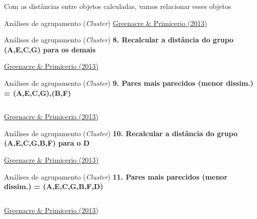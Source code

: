 \documentclass[
  ignorenonframetext,
]{beamer}
\begin{document}
\begin{frame}{Com as distâncias entre objetos calculadas, vamos
relacionar esses objetos}
\begin{block}{Análises de agrupamento (\emph{Cluster})}
\href{https://www.fbbva.es/microsite/multivariate-statistics/}{Greenacre
\& Primicerio (2013)}
\end{block}

\begin{block}{Análises de agrupamento (\emph{Cluster})}
\protect\hypertarget{anuxe1lises-de-agrupamento-cluster-7}{}
\textbf{8. Recalcular a distância do grupo (A,E,C,G) para os demais}

\href{https://www.fbbva.es/microsite/multivariate-statistics/}{Greenacre
\& Primicerio (2013)}
\end{block}

\begin{block}{Análises de agrupamento (\emph{Cluster})}
\protect\hypertarget{anuxe1lises-de-agrupamento-cluster-8}{}
\textbf{9. Pares mais parecidos (menor dissim.) = (A,E,C,G),(B,F)}

\begin{columns}[T]
\begin{column}{0.65\textwidth}
\end{column}

\begin{column}{0.35\textwidth}
\end{column}
\end{columns}

\href{https://www.fbbva.es/microsite/multivariate-statistics/}{Greenacre
\& Primicerio (2013)}
\end{block}

\begin{block}{Análises de agrupamento (\emph{Cluster})}
\protect\hypertarget{anuxe1lises-de-agrupamento-cluster-9}{}
\textbf{10. Recalcular a distância do grupo (A,E,C,G,B,F) para o D}

\href{https://www.fbbva.es/microsite/multivariate-statistics/}{Greenacre
\& Primicerio (2013)}
\end{block}

\begin{block}{Análises de agrupamento (\emph{Cluster})}
\protect\hypertarget{anuxe1lises-de-agrupamento-cluster-10}{}
\textbf{11. Pares mais parecidos (menor dissim.) = (A,E,C,G,B,F,D)}

\begin{columns}[T]
\begin{column}{0.65\textwidth}
\end{column}

\begin{column}{0.35\textwidth}
\end{column}
\end{columns}

\href{https://www.fbbva.es/microsite/multivariate-statistics/}{Greenacre
\& Primicerio (2013)}
\end{block}
\end{frame}
\end{document}

